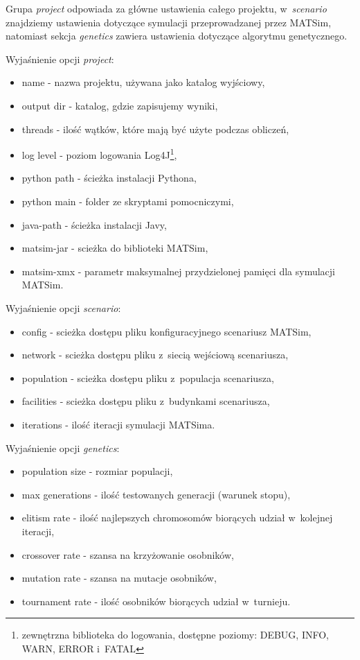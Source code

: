 \documentclass[twoside,12pt]{report}
\begin{document}
\vspace*{15px}

Grupa \textit{project} odpowiada za główne ustawienia całego projektu, w~\textit{scenario} znajdziemy ustawienia dotyczące symulacji przeprowadzanej przez MATSim, natomiast sekcja \textit{genetics} zawiera ustawienia dotyczące algorytmu genetycznego.

\vspace*{15px}

Wyjaśnienie opcji \textit{project}:
\begin{itemize}
\item name - nazwa projektu, używana jako katalog wyjściowy,
\item output dir - katalog, gdzie zapisujemy wyniki,
\item threads - ilość wątków, które mają być użyte podczas obliczeń,
\item log level - poziom logowania Log4J\footnote{zewnętrzna biblioteka do logowania, dostępne poziomy: DEBUG, INFO, WARN, ERROR i~FATAL},
\item python path - ścieżka instalacji Pythona,
\item python main - folder ze skryptami pomocniczymi,
\item java-path - ścieżka instalacji Javy,
\item matsim-jar - scieżka do biblioteki MATSim,
\item matsim-xmx - parametr maksymalnej przydzielonej pamięci dla symulacji MATSim.
\end{itemize}

\vspace*{15px}

Wyjaśnienie opcji \textit{scenario}:
\begin{itemize}
\item config - scieżka dostępu pliku konfiguracyjnego scenariusz MATSim,
\item network - scieżka dostępu pliku z~siecią wejściową scenariusza,
\item population - scieżka dostępu pliku z~populacja scenariusza,
\item facilities - scieżka dostępu pliku z~budynkami scenariusza,
\item iterations - ilość iteracji symulacji MATSima.
\end{itemize}

\vspace*{15px}

Wyjaśnienie opcji \textit{genetics}:
\begin{itemize}
\item population size - rozmiar populacji,
\item max generations - ilość testowanych generacji (warunek stopu),
\item elitism rate - ilość najlepszych chromosomów biorących udział w~kolejnej iteracji,
\item crossover rate - szansa na krzyżowanie osobników,
\item mutation rate - szansa na mutacje osobników,
\item tournament rate - ilość osobników biorących udział w~turnieju.
\end{itemize}
\end{document}
